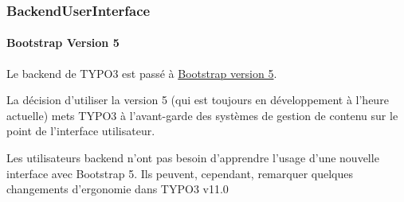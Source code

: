 %

\begin{frame}[fragile]
	\frametitle{BackendUserInterface}
	\framesubtitle{Bootstrap Version 5}

	Le backend de TYPO3 est passé à
	\href{https://getbootstrap.com/}{Bootstrap version 5}.

	\vspace{0.2cm}

	La décision d'utiliser la version 5 (qui est toujours en développement à
	l'heure actuelle) mets TYPO3 à l'avant-garde des systèmes de gestion de
	contenu sur le point de l'interface utilisateur.

	\vspace{0.2cm}

	Les utilisateurs backend n'ont pas besoin d'apprendre l'usage d'une
	nouvelle interface avec Bootstrap 5. Ils peuvent, cependant, remarquer
	quelques changements d'ergonomie dans TYPO3 v11.0

\end{frame}

